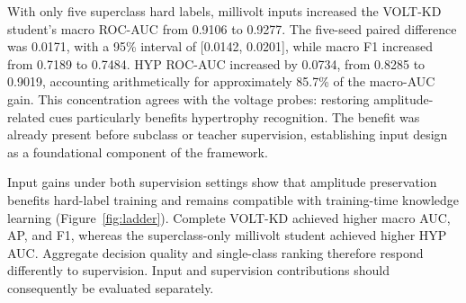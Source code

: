 \documentclass[11pt,a4paper]{article}
\begin{document}
With only five superclass hard labels, millivolt inputs increased the VOLT-KD student's macro ROC-AUC from 0.9106 to 0.9277. The five-seed paired difference was 0.0171, with a 95\% interval of [0.0142, 0.0201], while macro F1 increased from 0.7189 to 0.7484. HYP ROC-AUC increased by 0.0734, from 0.8285 to 0.9019, accounting arithmetically for approximately 85.7\% of the macro-AUC gain. This concentration agrees with the voltage probes: restoring amplitude-related cues particularly benefits hypertrophy recognition. The benefit was already present before subclass or teacher supervision, establishing input design as a foundational component of the framework.

Input gains under both supervision settings show that amplitude preservation benefits hard-label training and remains compatible with training-time knowledge learning (Figure~\ref{fig:ladder}). Complete VOLT-KD achieved higher macro AUC, AP, and F1, whereas the superclass-only millivolt student achieved higher HYP AUC. Aggregate decision quality and single-class ranking therefore respond differently to supervision. Input and supervision contributions should consequently be evaluated separately.
\end{document}
